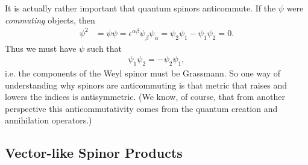 \documentclass[12pt, oneside]{report}    %
\begin{document}

% 
% 

It is actually rather important that quantum spinors anticommute. If the $\psi$ were \emph{commuting} objects, then
\begin{align}
    \psi^2 &= \psi\psi = \epsilon^{\alpha\beta}\psi_\beta\psi_\alpha = \psi_2\psi_1-\psi_1\psi_2 =0.
\end{align}
Thus we must have $\psi$ such that
\begin{align}
    \psi_1\psi_2 = -\psi_2\psi_1,
\end{align}
i.e. the components of the Weyl spinor must be Grassmann. 
So one way of understanding why spinors are anticommuting is that metric that raises and lowers the indices is antisymmetric. (We know, of course, that from another perspective this anticommutativity comes from the quantum creation and annihilation operators.)


\subsection{Vector-like Spinor Products}
\end{document}
